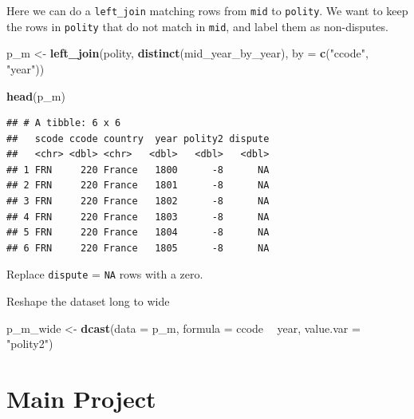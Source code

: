 \documentclass[]{book}
\newenvironment{Shaded}{\begin{snugshade}}{\end{snugshade}}
\newcommand{\KeywordTok}[1]{\textcolor[rgb]{0.13,0.29,0.53}{\textbf{#1}}}
\newcommand{\DataTypeTok}[1]{\textcolor[rgb]{0.13,0.29,0.53}{#1}}
\newcommand{\DecValTok}[1]{\textcolor[rgb]{0.00,0.00,0.81}{#1}}
\newcommand{\StringTok}[1]{\textcolor[rgb]{0.31,0.60,0.02}{#1}}
\newcommand{\OperatorTok}[1]{\textcolor[rgb]{0.81,0.36,0.00}{\textbf{#1}}}
\newcommand{\NormalTok}[1]{#1}
\theoremstyle{definition}
\theoremstyle{definition}
\theoremstyle{definition}
\theoremstyle{remark}
\begin{document}
Here we can do a \texttt{left\_join} matching rows from \texttt{mid} to
\texttt{polity}. We want to keep the rows in \texttt{polity} that do not
match in \texttt{mid}, and label them as non-disputes.

\begin{Shaded}
\begin{Highlighting}[]
\NormalTok{p_m <-}\StringTok{ }\KeywordTok{left_join}\NormalTok{(polity,}
                 \KeywordTok{distinct}\NormalTok{(mid_year_by_year),}
                 \DataTypeTok{by =} \KeywordTok{c}\NormalTok{(}\StringTok{"ccode"}\NormalTok{, }\StringTok{"year"}\NormalTok{))}

\KeywordTok{head}\NormalTok{(p_m)}
\end{Highlighting}
\end{Shaded}

\begin{verbatim}
## # A tibble: 6 x 6
##   scode ccode country  year polity2 dispute
##   <chr> <dbl> <chr>   <dbl>   <dbl>   <dbl>
## 1 FRN     220 France   1800      -8      NA
## 2 FRN     220 France   1801      -8      NA
## 3 FRN     220 France   1802      -8      NA
## 4 FRN     220 France   1803      -8      NA
## 5 FRN     220 France   1804      -8      NA
## 6 FRN     220 France   1805      -8      NA
\end{verbatim}

Replace \texttt{dispute} = \texttt{NA} rows with a zero.

\begin{Shaded}
\end{Shaded}

Reshape the dataset long to wide

\begin{Shaded}
\begin{Highlighting}[]
\NormalTok{p_m_wide <-}\StringTok{ }\KeywordTok{dcast}\NormalTok{(}\DataTypeTok{data =}\NormalTok{ p_m,}
                  \DataTypeTok{formula =}\NormalTok{ ccode }\OperatorTok{~}\StringTok{ }\NormalTok{year,}
                  \DataTypeTok{value.var =} \StringTok{"polity2"}\NormalTok{)}
\end{Highlighting}
\end{Shaded}

\section{Main Project}\label{main-project}
\end{document}
